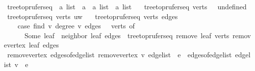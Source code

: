 \begin{isabellebody}
%
\endisadelimproof
\isanewline
{}\isamarkupfalse%
\ tree{\isacharunderscore}{\kern0pt}to{\isacharunderscore}{\kern0pt}prufer{\isacharunderscore}{\kern0pt}seq\ {\isacharcolon}{\kern0pt}{\isacharcolon}{\kern0pt}\ {\isachardoublequoteopen}{\isacharprime}{\kern0pt}a\ list\ {\isasymRightarrow}\ {\isacharparenleft}{\kern0pt}{\isacharprime}{\kern0pt}a\ {\isasymtimes}\ {\isacharprime}{\kern0pt}a{\isacharparenright}{\kern0pt}\ list\ {\isasymRightarrow}\ {\isacharprime}{\kern0pt}a\ list{\isachardoublequoteclose}\ \isanewline
\ \ {\isachardoublequoteopen}tree{\isacharunderscore}{\kern0pt}to{\isacharunderscore}{\kern0pt}prufer{\isacharunderscore}{\kern0pt}seq\ verts\ {\isacharbrackleft}{\kern0pt}{\isacharbrackright}{\kern0pt}\ {\isacharequal}{\kern0pt}\ undefined{\isachardoublequoteclose}\isanewline
{\isacharbar}{\kern0pt}\ {\isachardoublequoteopen}tree{\isacharunderscore}{\kern0pt}to{\isacharunderscore}{\kern0pt}prufer{\isacharunderscore}{\kern0pt}seq\ verts\ {\isacharbrackleft}{\kern0pt}{\isacharparenleft}{\kern0pt}u{\isacharcomma}{\kern0pt}w{\isacharparenright}{\kern0pt}{\isacharbrackright}{\kern0pt}\ {\isacharequal}{\kern0pt}\ {\isacharbrackleft}{\kern0pt}{\isacharbrackright}{\kern0pt}{\isachardoublequoteclose}\isanewline
{\isacharbar}{\kern0pt}\ {\isachardoublequoteopen}tree{\isacharunderscore}{\kern0pt}to{\isacharunderscore}{\kern0pt}prufer{\isacharunderscore}{\kern0pt}seq\ verts\ edges\ {\isacharequal}{\kern0pt}\isanewline
\ \ \ \ {\isacharparenleft}{\kern0pt}case\ find\ {\isacharparenleft}{\kern0pt}{\isasymlambda}v{\isachardot}{\kern0pt}\ degree\ v\ edges\ {\isacharequal}{\kern0pt}\ {}{\isacharparenright}{\kern0pt}\ verts\ of\isanewline
\ \ \ \ \ \ Some\ leaf\ {\isasymRightarrow}\ neighbor\ leaf\ edges\ {\isacharhash}{\kern0pt}\ tree{\isacharunderscore}{\kern0pt}to{\isacharunderscore}{\kern0pt}prufer{\isacharunderscore}{\kern0pt}seq\ {\isacharparenleft}{\kern0pt}remove{}\ leaf\ verts{\isacharparenright}{\kern0pt}\ {\isacharparenleft}{\kern0pt}remove{\isacharunderscore}{\kern0pt}vertex\ leaf\ edges{\isacharparenright}{\kern0pt}{\isacharparenright}{\kern0pt}{\isachardoublequoteclose}\isanewline
\isanewline
{}\isamarkupfalse%
\ remove{\isacharunderscore}{\kern0pt}vertex{\isacharcolon}{\kern0pt}\ {\isachardoublequoteopen}edges{\isacharunderscore}{\kern0pt}of{\isacharunderscore}{\kern0pt}edge{\isacharunderscore}{\kern0pt}list\ {\isacharparenleft}{\kern0pt}remove{\isacharunderscore}{\kern0pt}vertex\ v\ edge{\isacharunderscore}{\kern0pt}list{\isacharparenright}{\kern0pt}\ {\isacharequal}{\kern0pt}\ {\isacharbraceleft}{\kern0pt}e\ {\isasymin}\ edges{\isacharunderscore}{\kern0pt}of{\isacharunderscore}{\kern0pt}edge{\isacharunderscore}{\kern0pt}list\ edge{\isacharunderscore}{\kern0pt}list{\isachardot}{\kern0pt}\ v\ {\isasymnotin}\ e{\isacharbraceright}{\kern0pt}{\isachardoublequoteclose}\isanewline

\end{isabellebody}
